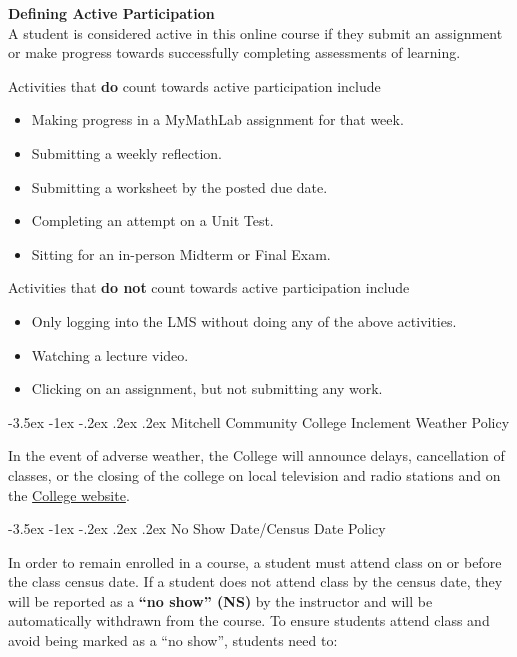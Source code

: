 \documentclass[11pt]{article}
\makeatletter
\renewcommand\section{\@startsection{section}{1}{0pt}%
  {-3.5ex \@plus -1ex \@minus -.2ex}%
  {.2ex \@plus.2ex}%
  {\normalfont\Large\bfseries}} %
\renewenvironment{framed}[1][]{%
  \def\FrameCommand{%
    \hspace{1pt}%
    {\color{mybordercolor}\vrule width 2pt} %
    \hspace{1pt}%
    \fboxsep=\FrameSep%
    \colorbox{mybgcolor}%
  }%
  \MakeFramed {\advance\hsize-\width \FrameRestore}%
}{%
  \endMakeFramed
}
\makeatother
\begin{document}
\begin{framed}
\textbf{Defining Active Participation}\\
A student is considered active in this online course if they submit an assignment or make progress towards successfully completing assessments of learning.

Activities that \textbf{do} count towards active participation include

\begin{itemize}
\item Making progress in a MyMathLab assignment for that week.
\item Submitting a weekly reflection.
\item Submitting a worksheet by the posted due date.
\item Completing an attempt on a Unit Test.
\item Sitting for an in-person Midterm or Final Exam.
\end{itemize}

Activities that \textbf{do not} count towards active participation include

\begin{itemize}
\item Only logging into the LMS without doing any of the above activities.
\item Watching a lecture video.
\item Clicking on an assignment, but not submitting any work.
\end{itemize}
\end{framed}

\section{Mitchell Community College Inclement Weather Policy}

In the event of adverse weather, the College will announce delays, cancellation of classes, or the closing of the college on local television and radio stations and on the \href{https://www.mitchellcc.edu}{College website}.

\section{No Show Date/Census Date Policy}

In order to remain enrolled in a course, a student must attend class on or before the class census date. If a student does not attend class by the census date, they will be reported as a \textbf{``no show'' (NS)} by the instructor and will be automatically withdrawn from the course.  To ensure students attend class and avoid being marked as a ``no show'', students need to:
\end{document}
